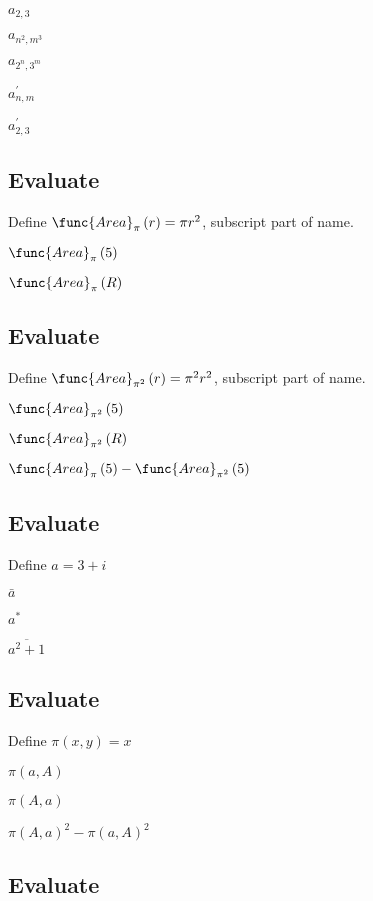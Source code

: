 \documentclass{article}
\begin{document}
$a_{2,3}$

$a_{n^{2},m^{3}}$

$a_{2^{n},3^{m}}$

$a_{n,m}^{\prime }$

$a_{2,3}^{\prime }$

\subsection{Evaluate}

Define $\func{Area}_{\pi }\left( r\right) =\pi r^{2}$, subscript part of
name.

$\func{Area}_{\pi }\left( 5\right) $

$\func{Area}_{\pi }\left( R\right) $

\subsection{Evaluate}

Define $\func{Area}_{\pi ^{2}}\left( r\right) =\pi ^{2}r^{2}$, subscript
part of name.

$\func{Area}_{\pi ^{2}}\left( 5\right) $

$\func{Area}_{\pi ^{2}}\left( R\right) $

$\func{Area}_{\pi }\left( 5\right) -\func{Area}_{\pi ^{2}}\left( 5\right) $

\subsection{Evaluate}

Define $a=3+i$

$\bar{a}$

$a^{\ast }$

$\overline{a^{2}+1}$

\subsection{Evaluate}

Define $\pi \left( x,y\right) =x$

$\pi \left( a,A\right) $

$\pi \left( A,a\right) $

$\pi \left( A,a\right) ^{2}-\pi \left( a,A\right) ^{2}$

\subsection{Evaluate}
\end{document}
